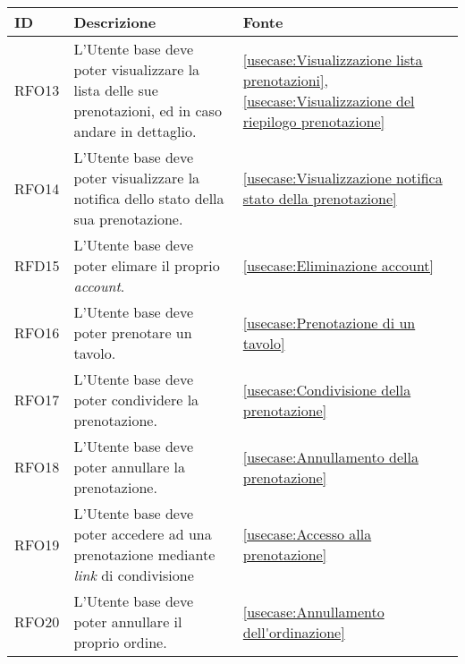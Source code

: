\begin{table}[H]
	\renewcommand{\arraystretch}{1.5}
	\centering
	\begin{tabularx}{\textwidth}{l|X|p{2cm}}
		\textbf{ID} & \textbf{Descrizione}                                                                                           & \textbf{Fonte}                                                                                                     \\
		\hline
		RFO13       & L'Utente base deve poter visualizzare la lista delle sue prenotazioni, ed in caso andare in dettaglio.         & \autoref{usecase:Visualizzazione lista prenotazioni}, \autoref{usecase:Visualizzazione del riepilogo prenotazione} \\
		\hline
		RFO14       & L'Utente base deve poter visualizzare la notifica dello stato della sua prenotazione.                          & \autoref{usecase:Visualizzazione notifica stato della prenotazione}                                                \\
		\hline
		RFD15       & L'Utente base deve poter elimare il proprio \textit{account}.                                                  & \autoref{usecase:Eliminazione account}                                                                             \\
		\hline
		RFO16       & L'Utente base deve poter prenotare un tavolo.                                                                  & \autoref{usecase:Prenotazione di un tavolo}                                                                        \\
		\hline
		RFO17       & L'Utente base deve poter condividere la prenotazione.                                                          & \autoref{usecase:Condivisione della prenotazione}                                                                  \\
		\hline
		RFO18       & L'Utente base deve poter annullare la prenotazione.                                                            & \autoref{usecase:Annullamento della prenotazione}                                                                  \\
		\hline
		RFO19       & L'Utente base deve poter accedere ad una prenotazione mediante \textit{link} di condivisione                   & \autoref{usecase:Accesso alla prenotazione}                                                                        \\
		\hline
		RFO20       & L'Utente base deve poter annullare il proprio ordine.                                                          & \autoref{usecase:Annullamento dell'ordinazione}                                                                    \\

\end{tabularx}
\end{table}
